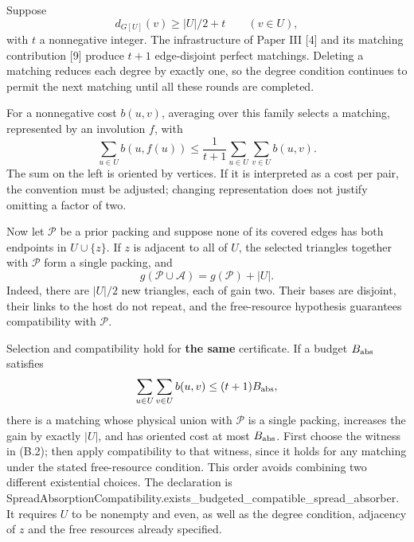 \documentclass[english,11pt,a4paper]{article}
\newcounter{none}
\begin{document}
Suppose \[
d_{G[U]}(v)\ge |U|/2+t\qquad(v\in U),
\tag{B.1}
\] with \(t\) a nonnegative integer. The infrastructure of Paper III {[}4{]} and its matching contribution {[}9{]} produce \(t+1\) edge-disjoint perfect matchings. Deleting a matching reduces each degree by exactly one, so the degree condition continues to permit the next matching until all these rounds are completed.

For a nonnegative cost \(b(u,v)\), averaging over this family selects a matching, represented by an involution \(f\), with \[
\sum_{u\in U}b(u,f(u))
\le\frac1{t+1}\sum_{u\in U}\sum_{v\in U}b(u,v).
\tag{B.2}
\] The sum on the left is oriented by vertices. If it is interpreted as a cost per pair, the convention must be adjusted; changing representation does not justify omitting a factor of two.

Now let \(\mathcal P\) be a prior packing and suppose none of its covered edges has both endpoints in \(U\cup\{z\}\). If \(z\) is adjacent to all of \(U\), the selected triangles together with \(\mathcal P\) form a single packing, and \[
g(\mathcal P\cup\mathcal A)=g(\mathcal P)+|U|.
\tag{B.3}
\] Indeed, there are \(|U|/2\) new triangles, each of gain two. Their bases are disjoint, their links to the host do not repeat, and the free-resource hypothesis guarantees compatibility with \(\mathcal P\).

Selection and compatibility hold for \textbf{the same} certificate. If a budget \(B_{\rm abs}\) satisfies \[
\sum_{u\in U}\sum_{v\in U}b(u,v)\le(t+1)B_{\rm abs},
\] there is a matching whose physical union with \(\mathcal P\) is a single packing, increases the gain by exactly \(|U|\), and has oriented cost at most \(B_{\rm abs}\). First choose the witness in (B.2); then apply compatibility to that witness, since it holds for any matching under the stated free-resource condition. This order avoids combining two different existential choices. The declaration is {\ttfamily\small SpreadAbsorp\discretionary{\hbox{\ensuremath{\hookrightarrow}}}{}{}tionCompatib\discretionary{\hbox{\ensuremath{\hookrightarrow}}}{}{}ility.\discretionary{\hbox{\ensuremath{\hookrightarrow}}}{}{}exists\_\discretionary{\hbox{\ensuremath{\hookrightarrow}}}{}{}budgeted\_\discretionary{\hbox{\ensuremath{\hookrightarrow}}}{}{}compatible\_\discretionary{\hbox{\ensuremath{\hookrightarrow}}}{}{}spread\_\discretionary{\hbox{\ensuremath{\hookrightarrow}}}{}{}absorber}. It requires \(U\) to be nonempty and even, as well as the degree condition, adjacency of \(z\) and the free resources already specified.
\end{document}
